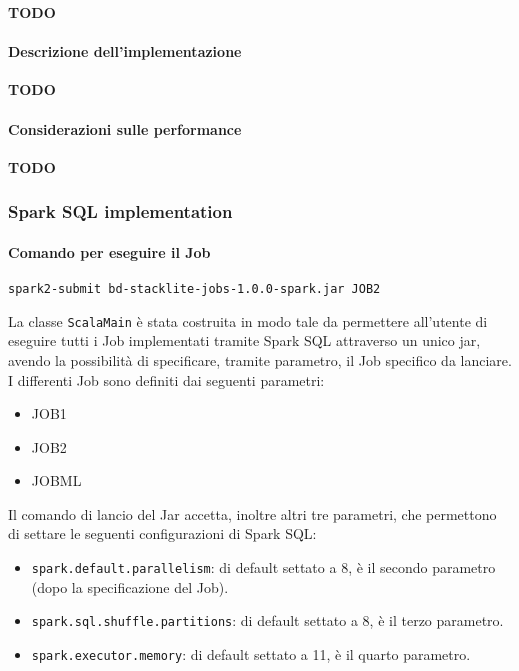   \textbf{TODO}

  \paragraph{Descrizione dell'implementazione}\label{par:job2:mapreduce:implementation}

  \textbf{TODO}

  \paragraph{Considerazioni sulle performance}\label{par:job2:mapreduce:performance}

  \textbf{TODO}

  \subsubsection{Spark SQL implementation}\label{subsub:job2:spark}

  \paragraph{Comando per eseguire il Job}\label{par:job2:spark:cmd}

  \texttt{spark2-submit bd-stacklite-jobs-1.0.0-spark.jar JOB2}

  La classe \texttt{ScalaMain} è stata costruita in modo tale da permettere all'utente di eseguire tutti i Job implementati tramite
  Spark SQL attraverso un unico jar, avendo la possibilità di specificare, tramite parametro, il Job specifico da lanciare.
  I differenti Job sono definiti dai seguenti parametri:
  \begin{itemize}
    \item JOB1
    \item JOB2
    \item JOBML
  \end{itemize}

  Il comando di lancio del Jar accetta, inoltre altri tre parametri, che permettono di settare le seguenti configurazioni di Spark SQL\@:
  \begin{itemize}
    \item \texttt{spark.default.parallelism}: di default settato a 8, è il secondo parametro (dopo la specificazione del Job).
    \item \texttt{spark.sql.shuffle.partitions}: di default settato a 8, è il terzo parametro.
    \item \texttt{spark.executor.memory}: di default settato a 11, è il quarto parametro.
  \end{itemize}

